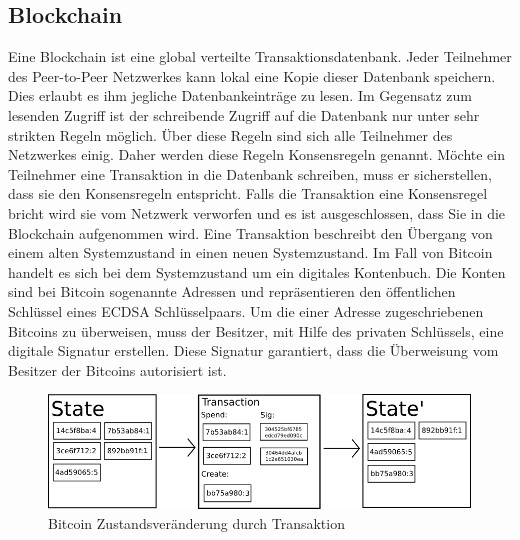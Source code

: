 \subsection{Blockchain}
Eine Blockchain ist eine global verteilte Transaktionsdatenbank. Jeder Teilnehmer des Peer-to-Peer Netzwerkes kann lokal eine Kopie dieser Datenbank speichern. Dies erlaubt es ihm jegliche Datenbankeinträge zu lesen. Im Gegensatz zum lesenden Zugriff ist der schreibende Zugriff auf die Datenbank nur unter sehr strikten Regeln möglich. Über diese Regeln sind sich alle Teilnehmer des Netzwerkes einig. Daher werden diese Regeln Konsensregeln genannt. Möchte ein Teilnehmer eine Transaktion in die Datenbank schreiben, muss er sicherstellen, dass sie den Konsensregeln entspricht. Falls die Transaktion eine Konsensregel bricht wird sie vom Netzwerk verworfen und es ist ausgeschlossen, dass Sie in die Blockchain aufgenommen wird. Eine Transaktion beschreibt den Übergang von einem alten Systemzustand in einen neuen Systemzustand.
Im Fall von Bitcoin handelt es sich bei dem Systemzustand um ein digitales Kontenbuch. Die Konten sind bei Bitcoin sogenannte Adressen und repräsentieren den öffentlichen Schlüssel eines ECDSA Schlüsselpaars. Um die einer Adresse zugeschriebenen Bitcoins zu überweisen, muss der Besitzer, mit Hilfe des privaten Schlüssels, eine digitale Signatur erstellen. Diese Signatur garantiert, dass die Überweisung vom Besitzer der Bitcoins autorisiert ist.

\begin{figure}[H]
\centering
\includegraphics[width=1\linewidth]{Figures/BTC_statetransition_ETH_white_paper}
\decoRule
\caption{Bitcoin Zustandsveränderung durch Transaktion}
\label{fig:BTC_statetransition_ETH_white_paper}
\end{figure}


